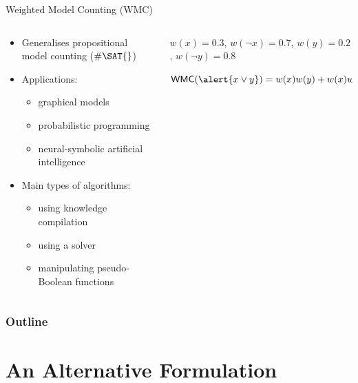 \documentclass{beamer}
\begin{document}
\begin{frame}[fragile]{Weighted Model Counting (WMC)}
  \begin{columns}
    \begin{column}{0.5\textwidth}
      \begin{itemize}
      \item Generalises propositional model counting ($\#\SAT{}$)
      \item Applications:
        \begin{itemize}
        \item graphical models
        \item probabilistic programming
        \item neural-symbolic artificial intelligence
        \end{itemize}
      \item Main types of algorithms:
        \begin{itemize}
        \item using knowledge compilation
        \item using a \SAT{} solver
        \item manipulating pseudo-Boolean functions
        \end{itemize}
      \end{itemize}
    \end{column}
    \begin{column}{0.5\textwidth}
      \begin{example}
      $w(x) = 0.3$, $w(\neg x) = 0.7$, $w(y) = 0.2$, $w(\neg y) = 0.8$
      \vspace{1cm}

      $\mathsf{WMC}(\alert{x \lor y}) = w(x)w(y) + w(x)w(\neg y) + w(\neg x)w(y)
      = 0.44$
      \end{example}
    \end{column}
  \end{columns}
\end{frame}

\begin{frame}
  \frametitle{Outline}
  \tableofcontents
\end{frame}

\section{An Alternative Formulation}
\end{document}
